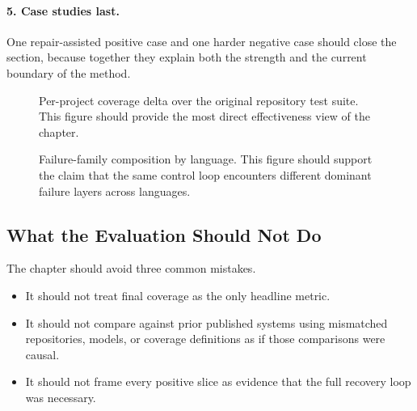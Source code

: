 \documentclass[10pt]{article}
\begin{document}
\paragraph{5. Case studies last.}
One repair-assisted positive case and one harder negative case should close the section, because together they explain both the strength and the current boundary of the method.

\begin{figure}[t]
\centering
{}
\caption{Per-project coverage delta over the original repository test suite. This figure should provide the most direct effectiveness view of the chapter.}
\label{fig:coverage-delta}
\end{figure}

\begin{figure}[t]
\centering
{}
\caption{Failure-family composition by language. This figure should support the claim that the same control loop encounters different dominant failure layers across languages.}
\label{fig:failure-family}
\end{figure}

\subsection{What the Evaluation Should Not Do}

The chapter should avoid three common mistakes.

\begin{itemize}[leftmargin=1.4em]
    \item It should not treat final coverage as the only headline metric.
    \item It should not compare against prior published systems using mismatched repositories, models, or coverage definitions as if those comparisons were causal.
    \item It should not frame every positive slice as evidence that the full recovery loop was necessary.
\end{itemize}
\end{document}
